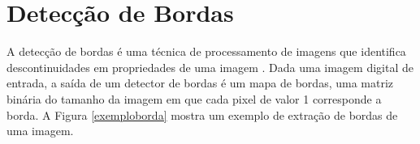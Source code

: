 



\section{Detecção de Bordas} \label{met:borda}


A detecção de bordas é uma técnica de processamento de imagens que identifica descontinuidades em propriedades de uma imagem \cite{borda01}. Dada uma imagem digital de entrada, a saída de um detector de bordas é um mapa de bordas, uma matriz binária do tamanho da imagem em que cada pixel de valor 1 corresponde a borda. A Figura \ref{exemploborda} mostra um exemplo de extração de bordas de uma imagem.





